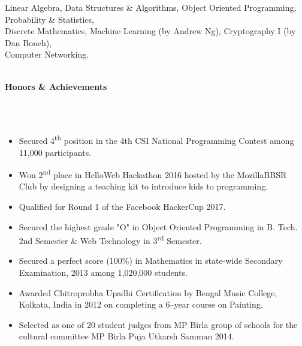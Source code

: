 \documentclass[a4paper,10pt]{article}
\newcommand{\lsep}{-0.5cm}
\newcommand{\resheading}[1]{{\large \colorbox{mygrey}{\begin{minipage}{0.99\textwidth}{\textbf{#1 \vphantom{p\^{E}}}}\end{minipage}}}}
\begin{document}
\indent Linear Algebra, Data Structures \& Algorithms, Object Oriented Programming, Probability \& Statistics,\\
\indent Discrete Mathematics, Machine Learning (by Andrew Ng), Cryptography I (by Dan Boneh),\\
\indent Computer Networking.\\\\


\resheading{\textbf{Honors \& Achievements}}\\[\lsep]\\[-0.2cm]
\begin{itemize}
\item {Secured 4\textsuperscript{th} position in the 4th CSI National Programming Contest among 11,000 participants.}
\item {Won 2\textsuperscript{nd} place in HelloWeb Hackathon 2016 hosted by the MozillaBBSR Club by designing a teaching kit to introduce kids to programming.}
\item {Qualified for Round 1 of the Facebook HackerCup 2017.}
\item {Secured the highest grade "O" in Object Oriented Programming in B. Tech. 2nd Semester \& Web Technology in 3\textsuperscript{rd} Semester.}
\item {Secured a perfect score (100\%) in Mathematics in state-wide Secondary Examination, 2013 among 1,020,000 students.}
\item {Awarded Chitroprobha Upadhi Certification by Bengal Music College, Kolkata, India in 2012 on completing a 6--year course on Painting.}\item{Selected as one of 20 student judges from MP Birla group of schools for the cultural committee MP Birla Puja Utkarsh Samman 2014.}
\end{itemize}
\end{document}
